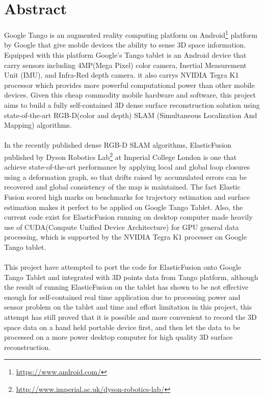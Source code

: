 \documentclass[12pt,twoside]{article}
\begin{document}



\section{Abstract}
Google Tango\cite{tango} is an augmented reality computing platform on Android\footnote{\url{https://www.android.com/}} platform by Google that give mobile devices the ability to sense 3D space information. Equipped with this platform Google's Tango tablet is an Android device that carry sensors including 4MP(Mega Pixel) color camera, Inertial Measurement Unit (IMU), and Infra-Red depth camera. it also carrys NVIDIA Tegra K1 processor which provides more powerful computational power than other mobile devices. Given this cheap commodity mobile hardware and software, this project aims to build a fully self-contained 3D dense surface reconstruction solution using  state-of-the-art RGB-D(color and depth) SLAM (Simultaneous Localization And Mapping) algorithms.\\
\\
In the recently published dense RGB-D SLAM algorithms, ElasticFusion\cite{whelan2016elasticfusion} published by Dyson Robotics Lab\footnote{\url{http://www.imperial.ac.uk/dyson-robotics-lab/}} at Imperial College London is one that achieve state-of-the-art performance by applying local and global loop closures using a deformation graph, so that drifts raised by accumulated errors can be recovered and global consistency of the map is maintained. The fact Elastic Fusion scored high marks on benchmarks for trajectory estimation and surface estimation makes it perfect to be applied on Google Tango Tablet. Also, the current code exist for ElasticFusion running on desktop computer made heavily use of CUDA(Compute Unified Device Architecture) for GPU general data processing, which is supported by the NVIDIA Tegra K1 processer on Google Tango tablet.\\
\\
This project have attempted to port the code for ElasticFusion onto Google Tango Tablet and integrated with 3D points data from Tango platform, although the result of running ElasticFusion on the tablet has shown to be not effective enough for self-contained real time application due to processing power and sensor problem on the tablet and time and effort limitation in this project, this attempt has still proved that it is possible and more convenient to record the 3D space data on a hand held portable device first, and then let the data to be processed on a more power desktop computer for high quality 3D surface reconstruction.\\
\end{document}
